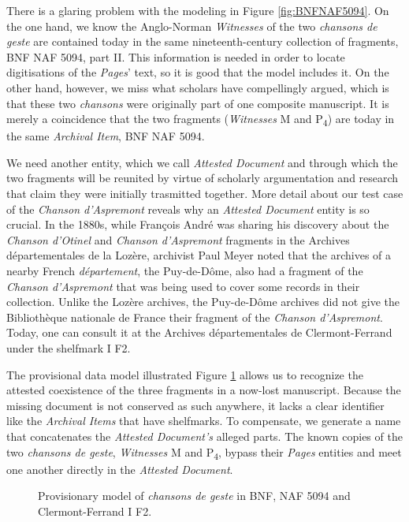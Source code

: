 There is a glaring problem with the modeling in Figure \ref{fig:BNFNAF5094}. On the one hand, we know the Anglo-Norman \textit{Witnesses} of the two \textit{chansons de geste} are contained today in the same nineteenth-century collection of fragments, BNF NAF 5094, part II. This information is needed in order to locate digitisations of the \textit{Pages}' text, so it is good that the model includes it. On the other hand, however, we miss what scholars have compellingly argued, which is that these two \textit{chansons} were originally part of one composite manuscript. It is merely a coincidence that the two fragments (\textit{Witnesses} M and P\textsubscript{4}) are today in the same \textit{Archival Item}, BNF NAF 5094.

We need another entity, which we call \textit{Attested Document} and through which the two fragments will be reunited by virtue of scholarly argumentation and research that claim they were initially trasmitted together. More detail about our test case of the \textit{Chanson d'Aspremont} reveals why an \textit{Attested Document} entity is so crucial. In the 1880s, while François André was sharing his discovery about the \textit{Chanson d'Otinel} and \textit{Chanson d'Aspremont} fragments in the Archives départementales de la Lozère, archivist Paul Meyer noted that the archives of a nearby French \textit{département}, the Puy-de-Dôme, also had a fragment of the \textit{Chanson d'Aspremont} that was being used to cover some records in their collection. Unlike the Lozère archives, the Puy-de-Dôme archives did not give the Bibliothèque nationale de France their fragment of the \textit{Chanson d'Aspremont}. Today, one can consult it at the Archives départementales de Clermont-Ferrand under the shelfmark I F2.

The provisional data model illustrated Figure \ref{fig:AspremontCFBNF} allows us to recognize the attested coexistence of the three fragments in a now-lost manuscript. Because the missing document is not conserved as such anywhere, it lacks a clear identifier like the \textit{Archival Items} that have shelfmarks. To compensate, we generate a name that concatenates the \textit{Attested Document's} alleged parts. The known copies of the two \textit{chansons de geste}, \textit{Witnesses} M and P\textsubscript{4}, bypass their \textit{Pages} entities and meet one another directly in the \textit{Attested Document}.

\begin{figure}[ht]
    \begin{center}
        
    \end{center}
    \caption{Provisionary model of \textit{chansons de geste} in BNF, NAF 5094 and Clermont-Ferrand I F2.}
    \label{fig:AspremontCFBNF}
\end{figure}

